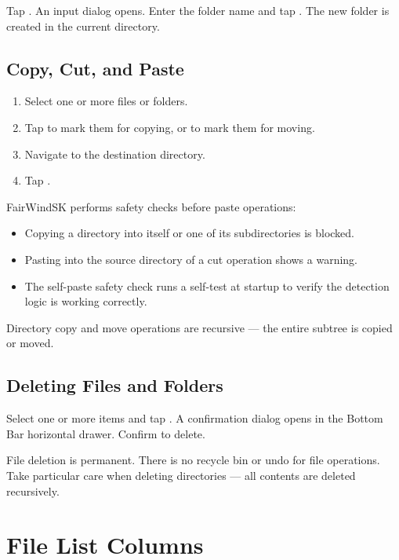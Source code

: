 Tap .
An input dialog opens.
Enter the folder name and tap .
The new folder is created in the current directory.

\subsection{Copy, Cut, and Paste}

\begin{enumerate}
  \item Select one or more files or folders.
  \item Tap  to mark them for copying, or  to mark them for moving.
  \item Navigate to the destination directory.
  \item Tap .
\end{enumerate}

FairWindSK performs safety checks before paste operations:

\begin{itemize}
  \item Copying a directory into itself or one of its subdirectories is blocked.
  \item Pasting into the source directory of a cut operation shows a warning.
  \item The self-paste safety check runs a self-test at startup to verify the detection logic is working correctly.
\end{itemize}

Directory copy and move operations are recursive --- the entire subtree is copied or moved.

\subsection{Deleting Files and Folders}

Select one or more items and tap .
A confirmation dialog opens in the Bottom Bar horizontal drawer.
Confirm to delete.

\begin{warningbox}
File deletion is permanent.
There is no recycle bin or undo for file operations.
Take particular care when deleting directories --- all contents are deleted recursively.
\end{warningbox}

\section{File List Columns}

